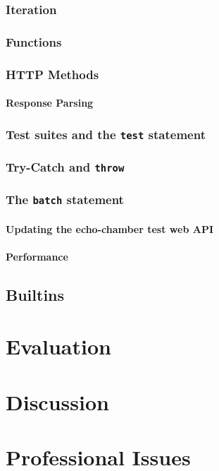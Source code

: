 \documentclass[]{full}
\theoremstyle{definition}
\begin{document}
\subsection{Iteration}

\subsection{Functions}

\subsection{HTTP Methods}

\subsubsection{Response Parsing}

\cprotect\subsection{Test suites and the \verb|test| statement}

\cprotect\subsection{Try-Catch and \verb|throw|}

\cprotect\subsection{The \verb|batch| statement}

\subsubsection{Updating the echo-chamber test web API}

\subsubsection{Performance}

\section{Builtins}

\chapter{Evaluation}
\label{chap:evaluation}

\chapter{Discussion}
\label{chap:discussion}

\chapter{Professional Issues}
\label{chap:professional-issues}

\newpage
\label{endpage}

\printbibliography
\end{document}
